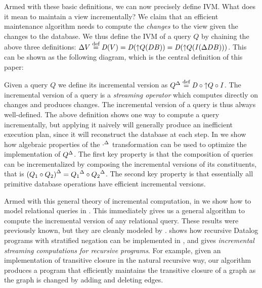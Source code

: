 Armed with these basic definitions, we can now precisely define IVM.
What does it mean to maintain a view incrementally?  We claim that an
efficient maintenance algorithm needs to compute the \emph{changes} to
the view given the changes to the database.  We thus define the IVM of
a query $Q$ by chaining the above three definitions:
$\Delta V \stackrel{\textrm{\scriptsize def}}{=} \mathit{D}(V) = \mathit{D}({\uparrow}Q(DB)) = \mathit{D}({\uparrow}Q(\mathit{I}(\Delta DB)))$.
This can be shown as the following diagram, which is the central definition
of this paper:

\begin{center}
\end{center}

Given a query $Q$ we define its incremental version as
${Q}^{\Delta} \stackrel{\textrm{\scriptsize def}}{=} \mathit{D} \circ {\uparrow}Q \circ \mathit{I}$.  The incremental version
of a query is a \emph{streaming operator} which computes directly on changes
and produces changes.  The incremental version of a query is thus always
well-defined.  The above definition shows one way to compute a query
incrementally, but applying it naively will generally produce an inefficient
execution plan, since it will reconstruct the database at each step.  In 
we show how algebraic properties of the ${\cdot}^{\Delta}$ transformation can be used to
optimize the implementation of ${Q}^{\Delta}$. The first key property is that the
composition of queries can be incrementalized by composing the incremental
versions of its constituents, that is
${(Q_1 \circ Q_2)}^{\Delta} = {Q_1}^{\Delta} \circ {Q_2}^{\Delta}$.  The second key
property is that essentially all primitive database operations have efficient incremental
versions.

Armed with this general theory of incremental computation, in 
we show how to model relational queries in \dbsp.  This immediately gives
us a general algorithm to compute the incremental version of any relational query.
These results were previously known, but they are cleanly modeled by \dbsp.
 shows how recursive Datalog
programs with stratified negation can be implemented in \dbsp, and  gives
\emph{incremental streaming computations for recursive programs}. For example, given an implementation of
transitive closure in the natural recursive way, our algorithm produces a program that efficiently maintains the
transitive closure of a graph as the graph is changed by adding and deleting edges.

